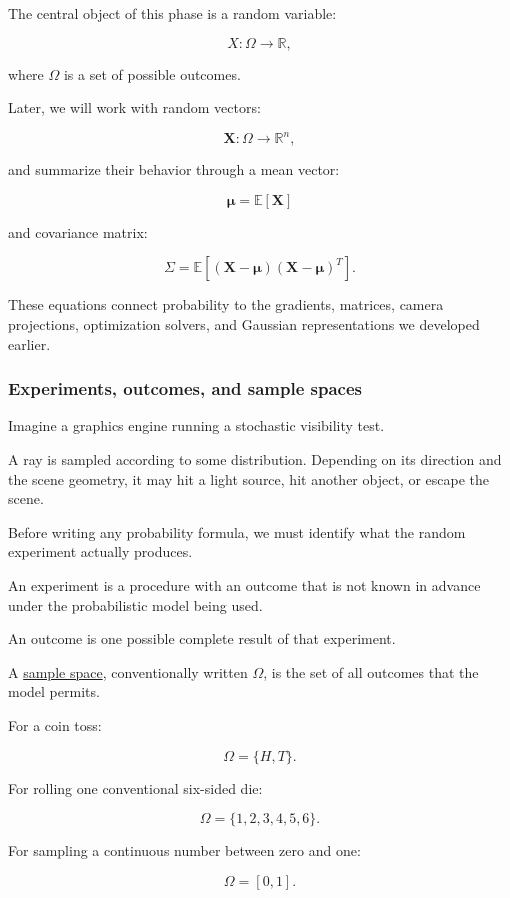 The central object of this phase is a random variable:

\[
 X:\Omega\rightarrow\mathbb R,
\]

where \(\Omega\) is a set of possible outcomes.

Later, we will work with random vectors:

\[
 \mathbf X:\Omega\rightarrow\mathbb R^n,
\]

and summarize their behavior through a mean vector:

\[
 \boldsymbol\mu=\mathbb E[\mathbf X]
\]

and covariance matrix:

\[
 \Sigma= \mathbb E[ (\mathbf X-\boldsymbol\mu) (\mathbf X-\boldsymbol\mu)^T ].
\]

These equations connect probability to the gradients, matrices, camera projections, optimization solvers, and Gaussian representations we developed earlier.

\subsubsection{Experiments, outcomes, and sample spaces}\label{experiments-outcomes-and-sample-spaces}

Imagine a graphics engine running a stochastic visibility test.

A ray is sampled according to some distribution. Depending on its direction and the scene geometry, it may hit a light source, hit another object, or escape the scene.

Before writing any probability formula, we must identify what the random experiment actually produces.

An experiment is a procedure with an outcome that is not known in advance under the probabilistic model being used.

An outcome is one possible complete result of that experiment.

A \hyperref[02-foundations-ii-ch023]{sample space}, conventionally written \(\Omega\), is the set of all outcomes that the model permits.

For a coin toss:

\[
 \Omega=\{H,T\}.
\]

For rolling one conventional six-sided die:

\[
 \Omega=\{1,2,3,4,5,6\}.
\]

For sampling a continuous number between zero and one:

\[
 \Omega=[0,1].
\]

